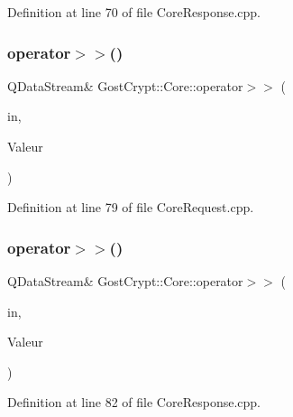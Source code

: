 Definition at line 70 of file Core\+Response.\+cpp.

\mbox{\label{namespace_gost_crypt_1_1_core_a0a56eb72d027d01dc82262b3cc60648e}} 
\subsubsection{\texorpdfstring{operator$>$$>$()}{operator>>()}\hspace{0.1cm}{\footnotesize\ttfamily [10/56]}}
{\footnotesize\ttfamily Q\+Data\+Stream\& Gost\+Crypt\+::\+Core\+::operator$>$$>$ (\begin{DoxyParamCaption}\item[{Q\+Data\+Stream \&}]{in,  }\item[{\hyperlink{struct_gost_crypt_1_1_core_1_1_create_volume_request_1_1_volume_params}{Create\+Volume\+Request\+::\+Volume\+Params} \&}]{Valeur }\end{DoxyParamCaption})}



Definition at line 79 of file Core\+Request.\+cpp.

\mbox{\label{namespace_gost_crypt_1_1_core_a8551d6cdab3d0483a76d9d1882b538ad}} 
\subsubsection{\texorpdfstring{operator$>$$>$()}{operator>>()}\hspace{0.1cm}{\footnotesize\ttfamily [11/56]}}
{\footnotesize\ttfamily Q\+Data\+Stream\& Gost\+Crypt\+::\+Core\+::operator$>$$>$ (\begin{DoxyParamCaption}\item[{Q\+Data\+Stream \&}]{in,  }\item[{\hyperlink{struct_gost_crypt_1_1_core_1_1_change_volume_password_response}{Change\+Volume\+Password\+Response} \&}]{Valeur }\end{DoxyParamCaption})}



Definition at line 82 of file Core\+Response.\+cpp.

